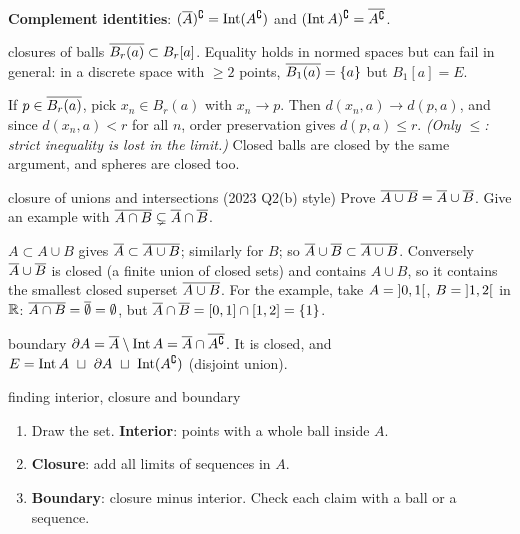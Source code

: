 \textbf{Complement identities}: $(\overline{A})^{\complement}=\operatorname{Int}(A^{\complement})$ and $(\operatorname{Int} A)^{\complement}=\overline{A^{\complement}}$.

\begin{thm}{closures of balls}
$\overline{B_r(a)}\subset B_r[a]$. Equality holds in normed spaces but can fail in general: in a
discrete space with $\ge2$ points, $\overline{B_1(a)}=\{a\}$ but $B_1[a]=E$.
\end{thm}
\begin{answer}
If $p\in\overline{B_r(a)}$, pick $x_n\in B_r(a)$ with $x_n\to p$. Then $d(x_n,a)\to d(p,a)$, and since
$d(x_n,a)<r$ for all $n$, order preservation gives $d(p,a)\le r$. \emph{(Only $\le$: strict
inequality is lost in the limit.)} Closed balls are closed by the same argument, and spheres are
closed too.
\end{answer}

\begin{exam}{closure of unions and intersections (2023 Q2(b) style)}
Prove $\overline{A\cup B}=\overline{A}\cup\overline{B}$. Give an example with $\overline{A\cap B}\subsetneq\overline{A}\cap\overline{B}$.
\end{exam}
\begin{answer}
$A\subset A\cup B$ gives $\overline{A}\subset\overline{A\cup B}$; similarly for $B$; so
$\overline{A}\cup\overline{B}\subset\overline{A\cup B}$. Conversely $\overline{A}\cup\overline{B}$ is closed (a finite union of
closed sets) and contains $A\cup B$, so it contains the smallest closed superset
$\overline{A\cup B}$. For the example, take $A=\mathopen{]}0,1\mathclose{[}$, $B=\mathopen{]}1,2\mathclose{[}$ in $\mathbb R$: $\overline{A\cap B}=\overline{\emptyset}
=\emptyset$, but $\overline{A}\cap\overline{B}=[0,1]\cap[1,2]=\{1\}$.
\end{answer}

\begin{defn}{boundary}
$\partial A=\overline{A}\setminus\operatorname{Int} A=\overline{A}\cap\overline{A^{\complement}}$. It is closed, and
$E=\inte A\ \sqcup\ \partial A\ \sqcup\ \inte(A\cpl)$ (disjoint union).
\end{defn}

\begin{steps}{finding interior, closure and boundary}
\begin{enumerate}
\item Draw the set. \textbf{Interior}: points with a whole ball inside $A$.
\item \textbf{Closure}: add all limits of sequences in $A$.
\item \textbf{Boundary}: closure minus interior. Check each claim with a ball or a sequence.
\end{enumerate}
\end{steps}

